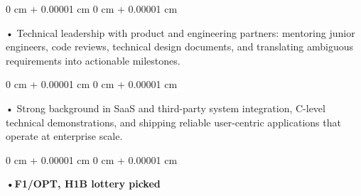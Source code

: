 \documentclass[10pt, letterpaper]{article}
\newenvironment{onecolentry}{
    \begin{adjustwidth}{
        0 cm + 0.00001 cm
    }{
        0 cm + 0.00001 cm
    }
}{
    \end{adjustwidth}
} %
\begin{document}
        \begin{onecolentry}
            • Technical leadership with product and engineering partners: mentoring junior engineers, code reviews, technical design documents, and translating ambiguous requirements into actionable milestones.
        \end{onecolentry}
        \begin{onecolentry}
            • Strong background in SaaS and third-party system integration, C-level technical demonstrations, and shipping reliable user-centric applications that operate at enterprise scale.
        \end{onecolentry}
        \begin{onecolentry}
                \textbf{•F1/OPT, H1B lottery picked}
        \end{onecolentry}

    \vspace{2 pt }
\end{document}
